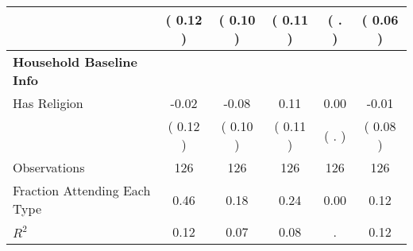 \begin{table}[H]
{\begin{tabular}{lccccc}
\quad  & (     0.12 ) & (     0.10 )  & (     0.11 )  & (        . ) & (     0.06 ) \\
\midrule
\textbf{Household Baseline Info} \\
\quad Has Religion &     -0.02 &     -0.08 &      0.11 &      0.00 &     -0.01 \\
\quad  & (     0.12 ) & (     0.10 )  & (     0.11 )  & (        . ) & (     0.08 ) \\
\midrule
Observations & 126 & 126 & 126 & 126 & 126 \\
Fraction Attending Each Type &      0.46 &      0.18 &      0.24 &      0.00 &      0.12 \\
\midrule
$ R^2$ &      0.12 &      0.07 &      0.08 &         . &      0.12 \\
\bottomrule
\end{tabular}}
\end{table}
